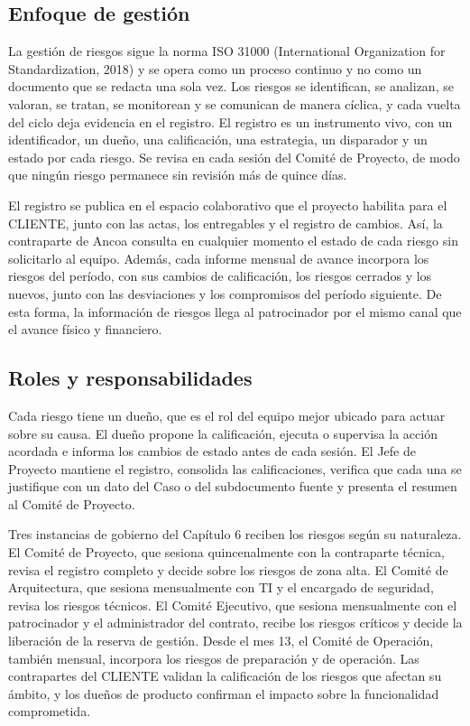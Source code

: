 \documentclass[11pt]{article}
\begin{document}
\setlength{\tabcolsep}{3pt}

\subsection{Enfoque de gestión}

La gestión de riesgos sigue la norma ISO 31000 (International Organization for Standardization, 2018) y se opera como un proceso continuo y no como un documento que se redacta una sola vez. Los riesgos se identifican, se analizan, se valoran, se tratan, se monitorean y se comunican de manera cíclica, y cada vuelta del ciclo deja evidencia en el registro. El registro es un instrumento vivo, con un identificador, un dueño, una calificación, una estrategia, un disparador y un estado por cada riesgo. Se revisa en cada sesión del Comité de Proyecto, de modo que ningún riesgo permanece sin revisión más de quince días.

El registro se publica en el espacio colaborativo que el proyecto habilita para el CLIENTE, junto con las actas, los entregables y el registro de cambios. Así, la contraparte de Ancoa consulta en cualquier momento el estado de cada riesgo sin solicitarlo al equipo. Además, cada informe mensual de avance incorpora los riesgos del período, con sus cambios de calificación, los riesgos cerrados y los nuevos, junto con las desviaciones y los compromisos del período siguiente. De esta forma, la información de riesgos llega al patrocinador por el mismo canal que el avance físico y financiero.

\subsection{Roles y responsabilidades}

Cada riesgo tiene un dueño, que es el rol del equipo mejor ubicado para actuar sobre su causa. El dueño propone la calificación, ejecuta o supervisa la acción acordada e informa los cambios de estado antes de cada sesión. El Jefe de Proyecto mantiene el registro, consolida las calificaciones, verifica que cada una se justifique con un dato del Caso o del subdocumento fuente y presenta el resumen al Comité de Proyecto.

Tres instancias de gobierno del Capítulo 6 reciben los riesgos según su naturaleza. El Comité de Proyecto, que sesiona quincenalmente con la contraparte técnica, revisa el registro completo y decide sobre los riesgos de zona alta. El Comité de Arquitectura, que sesiona mensualmente con TI y el encargado de seguridad, revisa los riesgos técnicos. El Comité Ejecutivo, que sesiona mensualmente con el patrocinador y el administrador del contrato, recibe los riesgos críticos y decide la liberación de la reserva de gestión. Desde el mes 13, el Comité de Operación, también mensual, incorpora los riesgos de preparación y de operación. Las contrapartes del CLIENTE validan la calificación de los riesgos que afectan su ámbito, y los dueños de producto confirman el impacto sobre la funcionalidad comprometida.
\end{document}
